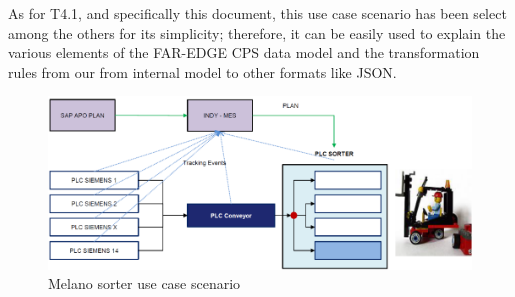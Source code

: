 As for T4.1, and specifically this document, this use case scenario has been select among the others for its simplicity; therefore, it can be easily used to explain the various elements of the FAR-EDGE CPS data model and the transformation rules from our from internal model to other formats like JSON.

\begin{figure}
	\centering
	\includegraphics[width=\linewidth]{images/Melano1}
	\caption{Melano sorter use case scenario}
	\label{fig:sorter1}
\end{figure}

